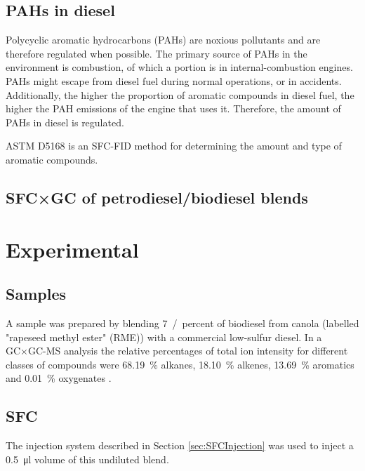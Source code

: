 \subsection{PAHs in diesel} 

Polycyclic aromatic hydrocarbons (PAHs) are noxious pollutants and are therefore
regulated when possible. The primary source of PAHs in the environment is
combustion, of which a portion is in internal-combustion engines.  PAHs might
escape from diesel fuel during normal operations, or in accidents. Additionally,
the higher the proportion of aromatic compounds in diesel fuel, the higher the
PAH emissions of the engine that uses it. Therefore, the amount of PAHs in
diesel is regulated.

ASTM D5168 \autocite{ASTMD5186} is an SFC-FID method for determining the amount and type of aromatic
compounds.

\subsection{SFC×GC of petrodiesel/biodiesel blends}


\section{Experimental}

\subsection{Samples} 

A sample was prepared by blending \SI{7}{/percent} of biodiesel from canola
(labelled "rapeseed methyl ester" (RME)) with a commercial low-sulfur diesel. In a
GC×GC-MS analysis the relative percentages of total ion intensity for different
classes of compounds were \SI{68.19}{\percent} alkanes, \SI{18.10}{\percent}
alkenes, \SI{13.69}{\percent} aromatics and \SI{0.01}{\percent} oxygenates
\autocite{Smit2015}.


\subsection{SFC}

The injection system described in Section
\ref{sec:SFCInjection} was used to inject a \SI{0.5}{\micro\litre} volume of
this undiluted  blend.

